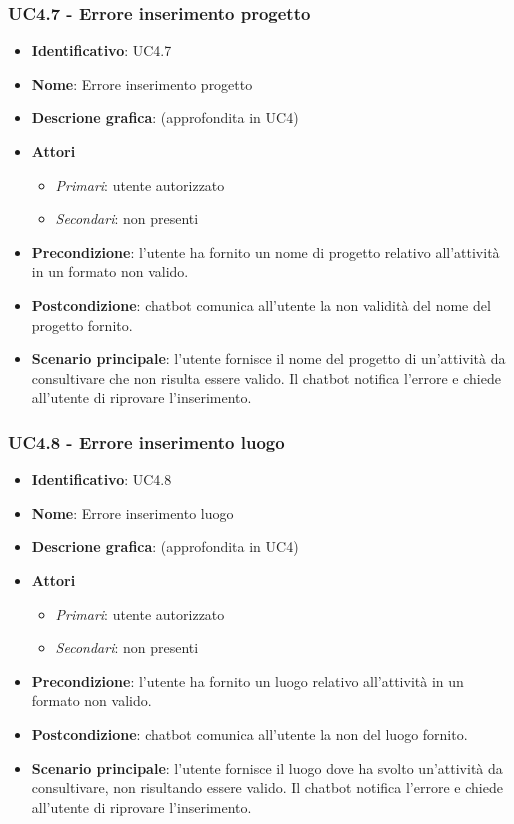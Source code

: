 \subsubsection{UC4.7 - Errore inserimento progetto}
\begin{itemize}
    \item \textbf{Identificativo}: UC4.7
    \item \textbf{Nome}: Errore inserimento progetto
    \item \textbf{Descrione grafica}: (approfondita in UC4)
    \item \textbf{Attori}
        \begin{itemize} 
            \item \textit{Primari}: utente autorizzato
            \item \textit{Secondari}: non presenti
        \end{itemize}
    \item \textbf{Precondizione}: l'utente ha fornito un nome di progetto relativo all'attività in un formato non valido. 
    \item \textbf{Postcondizione}: chatbot comunica all'utente la non validità del nome del progetto fornito.
    \item \textbf{Scenario principale}: l'utente fornisce il nome del progetto di un'attività da consultivare che non risulta essere valido. Il chatbot notifica l'errore e chiede all'utente di riprovare l'inserimento. 
\end{itemize}

\subsubsection{UC4.8 - Errore inserimento luogo}
\begin{itemize}
    \item \textbf{Identificativo}: UC4.8
    \item \textbf{Nome}: Errore inserimento luogo
    \item \textbf{Descrione grafica}: (approfondita in UC4)
    \item \textbf{Attori}
        \begin{itemize} 
            \item \textit{Primari}: utente autorizzato
            \item \textit{Secondari}: non presenti
        \end{itemize}
    \item \textbf{Precondizione}: l'utente ha fornito un luogo relativo all'attività in un formato non valido. 
    \item \textbf{Postcondizione}: chatbot comunica all'utente la non del luogo fornito.
    \item \textbf{Scenario principale}: l'utente fornisce il luogo dove ha svolto un'attività da consultivare, non risultando essere valido. Il chatbot notifica l'errore e chiede all'utente di riprovare l'inserimento. 
\end{itemize}
\newpage